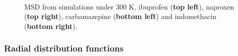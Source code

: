 \begin{figure}[htb]
	\centering
	\\
	\caption{MSD from simulations under 300 K, ibuprofen (\textbf{top left}), naproxen (\textbf{top right}), carbamazepine (\textbf{bottom left}) and indomethacin (\textbf{bottom right}).}
	\label{fig:msd_r1}    
\end{figure}

\subsubsection{Radial distribution functions}

